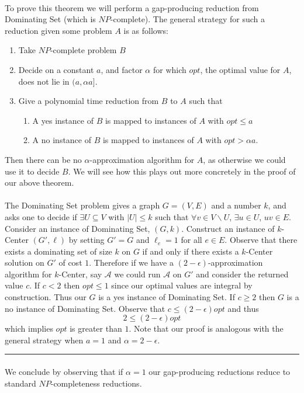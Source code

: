 \documentclass[letterpaper,12pt,oneside,onecolumn]{article}
\newcommand{\cA}{\mathcal{A}} \newcommand{\cB}{\mathcal{B}}
\newenvironment{proof}{{\bf Proof:  }}{\hfill\rule{2mm}{2mm}}
\begin{document}
\paragraph{}
To prove this theorem we will perform a gap-producing reduction from Dominating Set (which is $NP$-complete). The general strategy for such a reduction given some problem $A$ is as follows:
\begin{enumerate}
\item Take $NP$-complete problem $B$
\item Decide on a constant $a$, and factor $\alpha$ for which $opt$, the optimal value for $A$, does not lie in $(a, \alpha a]$.
\item Give a polynomial time reduction from $B$ to $A$ such that
\begin{enumerate}
\item A yes instance of $B$ is mapped to instances of $A$ with $opt \leq a$
\item A no instance of $B$ is mapped to instances of $A$ with $opt > \alpha a$.
\end{enumerate}
\end{enumerate}
Then there can be no $\alpha$-approximation algorithm for $A$, as otherwise we could use it to decide $B$. We will see how this plays out more concretely in the proof of our above theorem.\\ \\
\begin{proof}
The Dominating Set problem gives a graph $G = (V,E)$ and a number $k$, and asks one to decide if $\exists U \subseteq V$ with $|U| \leq k$ such that $\forall v \in V\backslash U$, $\exists u \in U$, $uv \in E$. Consider an instance of Dominating Set, $(G,k)$. Construct an instance of $k$-Center $(G', \ell)$ by setting $G' = G$ and $\ell_e =1$ for all $e \in E$. Observe that there exists a dominating set of size $k$ on $G$ if and only if there exists a $k$-Center solution on $G'$ of cost $1$. Therefore if we have a $(2-\epsilon)$-approximation algorithm for $k$-Center, say $\cA$ we could run $\cA$ on $G'$ and consider the returned value $c$. If $c < 2$ then $opt \leq 1$ since our optimal values are integral by construction. Thus our $G$ is a yes instance of Dominating Set. If $c \geq 2$ then $G$ is a no instance of Dominating Set. Observe that $c \leq (2-\epsilon) opt$ and thus
$$2 \leq (2-\epsilon)opt$$
which implies $opt$ is greater than $1$. Note that our proof is analogous with the general strategy when $a = 1$ and $\alpha = 2-\epsilon$.
\end{proof}
\paragraph{}
We conclude by observing that if $\alpha = 1$ our gap-producing reductions reduce to standard $NP$-completeness reductions.
\end{document}
